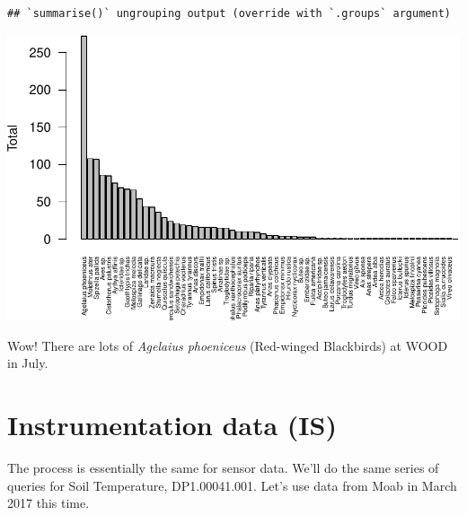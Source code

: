 \documentclass[]{book}
\newenvironment{Shaded}{\begin{snugshade}}{\end{snugshade}}
\newcommand{\CommentTok}[1]{\textcolor[rgb]{0.56,0.35,0.01}{\textit{#1}}}
\newcommand{\DataTypeTok}[1]{\textcolor[rgb]{0.13,0.29,0.53}{#1}}
\newcommand{\DecValTok}[1]{\textcolor[rgb]{0.00,0.00,0.81}{#1}}
\newcommand{\FloatTok}[1]{\textcolor[rgb]{0.00,0.00,0.81}{#1}}
\newcommand{\KeywordTok}[1]{\textcolor[rgb]{0.13,0.29,0.53}{\textbf{#1}}}
\newcommand{\NormalTok}[1]{#1}
\newcommand{\OperatorTok}[1]{\textcolor[rgb]{0.81,0.36,0.00}{\textbf{#1}}}
\newcommand{\StringTok}[1]{\textcolor[rgb]{0.31,0.60,0.02}{#1}}
\begin{document}
\begin{verbatim}
## `summarise()` ungrouping output (override with `.groups` argument)
\end{verbatim}

\begin{Shaded}
\end{Shaded}

\includegraphics{_main_files/figure-latex/os-plot-bird-data-1.pdf}

Wow! There are lots of \emph{Agelaius phoeniceus} (Red-winged Blackbirds) at WOOD in July.

\hypertarget{instrumentation-data-is}{%
\section{Instrumentation data (IS)}\label{instrumentation-data-is}}

The process is essentially the same for sensor data. We'll do the same series of
queries for Soil Temperature, DP1.00041.001. Let's use data from Moab in March
2017 this time.
\end{document}
